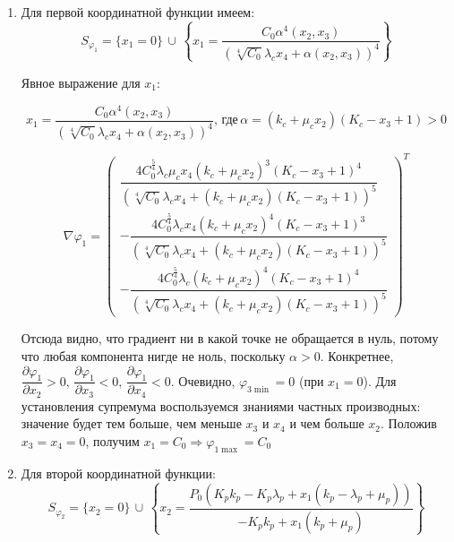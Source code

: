 \documentclass[12pt,a4paper]{article}
\begin{document}
\begin{enumerate}
    
    \item Для первой координатной функции имеем:
    \[ S_{\varphi_1} = \{ x_1 = 0\}\, \cup \, 
    \left\{ x_1 = 
    \frac{C_{0} \alpha^{4}{\left(x_{2},x_{3} \right)}}{\left(\sqrt[4]{C_{0}} \lambda_{c} x_{4} + \alpha{\left(x_{2},x_{3} \right)}\right)^{4}}
    \right\} \]

    Явное выражение для $x_1$:

        
        $$ x_1 = \frac{C_{0} \alpha^{4}{\left(x_{2},x_{3} \right)}}{\left(\sqrt[4]{C_{0}} \lambda_{c} x_{4} + \alpha{\left(x_{2},x_{3} \right)}\right)^{4}},\, \text{где}\, \alpha = \left(k_{c} + \mu_{c} x_{2}\right) \left(K_{c} - x_{3} + 1\right) > 0$$

        
        $$\nabla \varphi_1 = \left(
            \begin{matrix}\dfrac{4 C_{0}^{\frac{5}{4}} \lambda_{c} \mu_{c} x_{4} \left(k_{c} + \mu_{c} x_{2}\right)^{3} \left(K_{c} - x_{3} + 1\right)^{4}}{\left(\sqrt[4]{C_{0}} \lambda_{c} x_{4} + \left(k_{c} + \mu_{c} x_{2}\right) \left(K_{c} - x_{3} + 1\right)\right)^{5}} 
            \\
            - \dfrac{4 C_{0}^{\frac{5}{4}} \lambda_{c} x_{4} \left(k_{c} + \mu_{c} x_{2}\right)^{4} \left(K_{c} - x_{3} + 1\right)^{3}}{\left(\sqrt[4]{C_{0}} \lambda_{c} x_{4} + \left(k_{c} + \mu_{c} x_{2}\right) \left(K_{c} - x_{3} + 1\right)\right)^{5}} 
            \\
            - \dfrac{4 C_{0}^{\frac{5}{4}} \lambda_{c} \left(k_{c} + \mu_{c} x_{2}\right)^{4} \left(K_{c} - x_{3} + 1\right)^{4}}{\left(\sqrt[4]{C_{0}} \lambda_{c} x_{4} + \left(k_{c} + \mu_{c} x_{2}\right) \left(K_{c} - x_{3} + 1\right)\right)^{5}}
            \end{matrix}\right)^T $$

    Отсюда видно, что градиент ни в какой точке не обращается в нуль, потому что любая компонента нигде не ноль, поскольку \(\alpha > 0.\)
    Конкретнее,
    \(\dfrac{\partial \varphi_1}{\partial x_2} > 0,\,  \dfrac{\partial \varphi_1}{\partial x_3} < 0,\,  \dfrac{\partial \varphi_1}{\partial x_4} < 0.\)
    Очевидно, \(\varphi_{3 \min} = 0\) (при \(x_1 = 0\)). Для установления
    супремума воспользуемся знаниями частных производных: значение будет тем
    больше, чем меньше \(x_3\) и \(x_4\) и чем больше \(x_2\). Положив
    \(x_3 = x_4 = 0\), получим
    \(x_1 = C_0 \Rightarrow \varphi_{1 \max} = C_0\)

    \item Для второй координатной функции:
    \[ S_{\varphi_2} = \{ x_2 = 0\}\, \cup \, 
    \left\{ x_2 = 
    \dfrac{P_{0} \left(K_{p} k_{p} - K_{p} \lambda_{p} + x_{1} \left(k_{p} - \lambda_{p} + \mu_{p}\right)\right)}{- K_{p} k_{p} + x_{1} \left(k_{p} + \mu_{p}\right)}
    \right\} \]
    

\end{enumerate}
\end{document}
